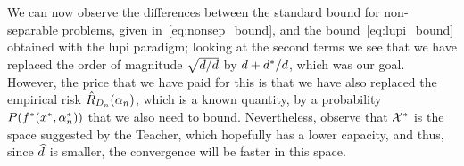 
We can now observe the differences between the standard bound for non-separable problems, given in~\eqref{eq:nonsep_bound}, and the bound~\eqref{eq:lupi_bound} obtained with the \acrshort{lupi} paradigm; looking at the second terms we see that we have replaced the order of magnitude $\sqrt{d/d}$ by ${d + d^*/d}$, which was our goal. However, the price that we have paid for this is that we have also replaced the empirical risk $\hat{R}_{D_{n}}(\alpha_n)$, which is a known quantity, by a probability $P(f^*(x^*, \alpha^*_n))$ that we also need to bound. 
%
Nevertheless, observe that $\mathcal{X}^*$ is the space suggested by the Teacher, which hopefully has a lower capacity, and thus, since $\widehat{d}$ is smaller, the convergence will be faster in this space.

